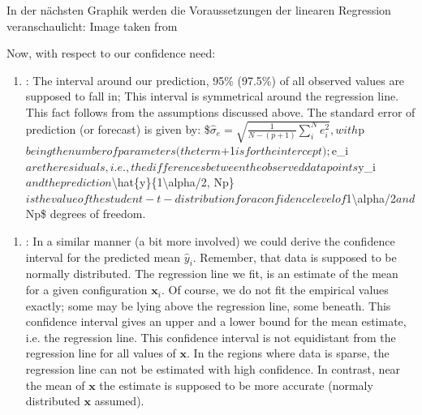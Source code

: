 \documentclass[letterpaper,10pt,english]{jupyterBook}
\begin{document}
\sphinxAtStartPar
In der nächsten Graphik werden die Voraussetzungen der linearen Regression veranschaulicht:
Image taken from 

\noindent{}

\sphinxAtStartPar
Now, with respect to our confidence need:
\begin{enumerate}
%
\item {} 
\sphinxAtStartPar
{}: The interval around our prediction, 95\% (97.5\%) of all observed values are supposed to fall in; This interval is symmetrical around the regression line. This fact follows from the assumptions discussed above. The standard error of prediction (or forecast) is given by: \$\(\hat{\sigma}_e = \sqrt{\frac{1}{N-(p+1)}\sum_i^N e_i^2},\)\(
with \)p\( being the number of parameters (the term \)+1\( is for the intercept); \)e\_i\( are the residuals, i.e., the differences between the observed data points \)y\_i\( and the prediction \)\textbackslash{}hat\{y\}\{1\sphinxhyphen{}\textbackslash{}alpha/2, N\sphinxhyphen{}p\}\( is the value of the student-t-distribution for a confidence level of \)1\sphinxhyphen{}\textbackslash{}alpha/2\( and \)N\sphinxhyphen{}p\$ degrees of freedom.

\end{enumerate}
\begin{enumerate}
%
\item {} 
\sphinxAtStartPar
{}: In a similar manner (a bit more involved) we could derive the confidence interval for the predicted mean \(\hat{y}_i\). Remember, that data is supposed to be normally distributed. The regression line we fit, is an estimate of the mean for a given configuration \(\mathbf{x}_i\). Of course, we do not fit the empirical values exactly; some may be lying above the regression line, some beneath. This confidence interval gives an upper and a lower bound for the mean estimate, i.e. the regression line. This confidence interval is not equidistant from the regression line for all values of \(\mathbf{x}\). In the regions where data is sparse, the regression line can not be estimated with high confidence. In contrast, near the mean of \(\mathbf{x}\) the estimate is supposed to be more accurate (normaly distributed \(\mathbf{x}\) assumed).

\end{enumerate}
\end{document}
